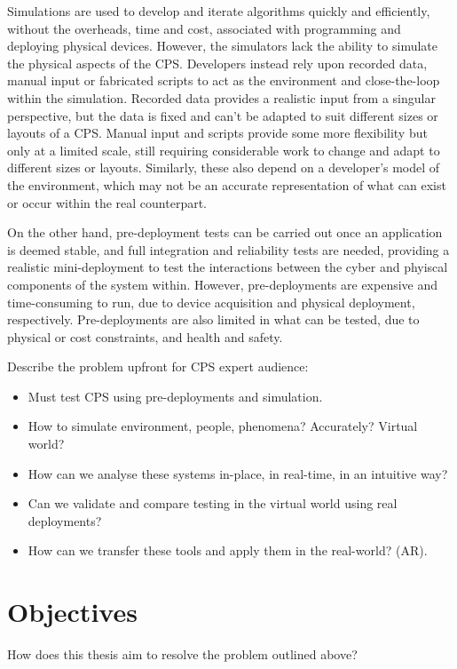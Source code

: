 Simulations are used to develop and iterate algorithms quickly and efficiently, without the overheads, time and cost, associated with programming and deploying physical devices. However, the simulators lack the ability to simulate the physical aspects of the CPS. Developers instead rely upon recorded data, manual input or fabricated scripts to act as the environment and close-the-loop within the simulation. Recorded data provides a realistic input from a singular perspective, but the data is fixed and can't be adapted to suit different sizes or layouts of a CPS. Manual input and scripts provide some more flexibility but only at a limited scale, still requiring considerable work to change and adapt to different sizes or layouts. Similarly, these also depend on a developer's model of the environment, which may not be an accurate representation of what can exist or occur within the real counterpart.

On the other hand, pre-deployment tests can be carried out once an application is deemed stable, and full integration and reliability tests are needed, providing a realistic mini-deployment to test the interactions between the cyber and phyiscal components of the system within. However, pre-deployments are expensive and time-consuming to run, due to device acquisition and physical deployment, respectively. Pre-deployments are also limited in what can be tested, due to physical or cost constraints, and health and safety. 


Describe the problem upfront for CPS expert audience:
\begin{itemize}
  \item Must test CPS using pre-deployments and simulation.
  \item How to simulate environment, people, phenomena? Accurately? Virtual world?
  \item How can we analyse these systems in-place, in real-time, in an intuitive way?
  \item Can we validate and compare testing in the virtual world using real deployments?
  \item How can we transfer these tools and apply them in the real-world? (AR).
\end{itemize}




\section{Objectives}
\label{sec:Objectives}
How does this thesis aim to resolve the problem outlined above?

